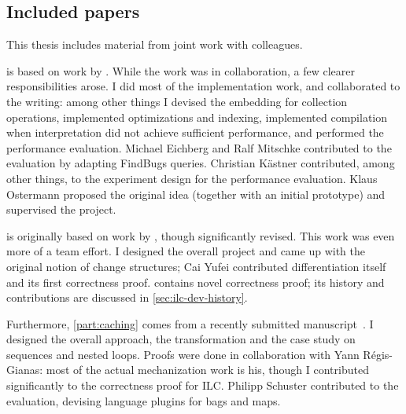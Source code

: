 \subsection{Included papers}
This thesis includes material from joint work with colleagues.

 is based on work by \citet*{GiarrussoAOSD13}. While the
work was in collaboration, a few clearer responsibilities arose.
I did most of the implementation work, and collaborated to the writing: among
other things I devised the embedding for collection operations, implemented
optimizations and indexing, implemented compilation when interpretation did not
achieve sufficient performance, and performed the performance evaluation.
Michael Eichberg and Ralf Mitschke contributed to the evaluation by adapting
FindBugs queries.
Christian K{\"{a}}stner contributed, among other things, to the experiment
design for the performance evaluation. Klaus Ostermann proposed the original
idea (together with an initial prototype) and supervised the project.

 is originally based on work by \citet*{CaiEtAl2014ILC}, though
significantly revised. This work was even more of a team effort. I designed the
overall project and came up with the original notion of change structures; Cai
Yufei contributed differentiation itself and its first correctness proof.
 contains novel correctness proof; its history and
contributions are discussed in \cref{sec:ilc-dev-history}.

Furthermore, \cref{part:caching} comes from a recently submitted
manuscript~\citep*{Giarrusso2018Static}. I
designed the overall approach, the transformation and the case study on
sequences and nested loops. Proofs were done in collaboration with Yann
Régis-Gianas: most of the actual mechanization work is his, though I contributed significantly to the
correctness proof for ILC. Philipp Schuster contributed to the evaluation,
devising language plugins for bags and maps.



